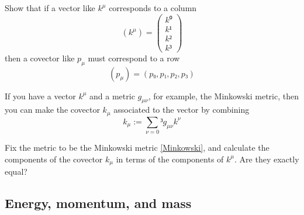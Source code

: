 \begin{exercise}
Show that if a vector like $k^μ$ corresponds to a column 
$$
\left( k^μ \right) =\left( \begin{array}{c} k⁰\\ k¹ \\ k² \\k³\end{array}\right) 
$$
then a covector like $p_μ$ must correspond to a row 
$$
\left( p_μ \right) =\left( p₀ , p₁ , p₂ ,p₃ \right) 
$$
\end{exercise}
If you have a vector $k^μ$ and a metric $g_{μν}$, for example, the Minkowski metric, then you can make the covector $k_μ$ associated to the vector by combining 
$$
k_μ := ∑_{ν =0}³ g_{μν} k^ν
$$
\begin{exercise}
Fix the metric to be the Minkowski metric \eqref{Minkowski}, and  calculate the components of the covector $k_μ$ in terms of the components of $k^μ$. Are they exactly equal?
\end{exercise}


\subsection{Energy, momentum, and mass}

